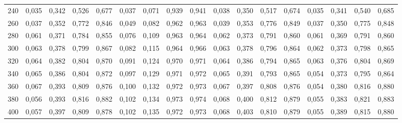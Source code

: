 \begin{table}[htb]
{\begin{tabular}{@{}rrrrrrrrrrrrrrrrr@{}}
240 & 0,035 & 0,342 & 0,526 & 0,677 & 0,037 & 0,071 & 0,939 & 0,941 & 0,038 & 0,350 & 0,517 & 0,674 & 0,035 & 0,341 & 0,540 & 0,685 \\
260 & 0,037 & 0,352 & 0,772 & 0,846 & 0,049 & 0,082 & 0,962 & 0,963 & 0,039 & 0,353 & 0,776 & 0,849 & 0,037 & 0,350 & 0,775 & 0,848 \\
280 & 0,061 & 0,371 & 0,784 & 0,855 & 0,076 & 0,109 & 0,963 & 0,964 & 0,062 & 0,373 & 0,791 & 0,860 & 0,061 & 0,369 & 0,791 & 0,860 \\
300 & 0,063 & 0,378 & 0,799 & 0,867 & 0,082 & 0,115 & 0,964 & 0,966 & 0,063 & 0,378 & 0,796 & 0,864 & 0,062 & 0,373 & 0,798 & 0,865 \\
320 & 0,064 & 0,382 & 0,804 & 0,870 & 0,091 & 0,124 & 0,970 & 0,971 & 0,064 & 0,386 & 0,794 & 0,865 & 0,063 & 0,376 & 0,804 & 0,869 \\
340 & 0,065 & 0,386 & 0,804 & 0,872 & 0,097 & 0,129 & 0,971 & 0,972 & 0,065 & 0,391 & 0,793 & 0,865 & 0,054 & 0,373 & 0,795 & 0,864 \\
360 & 0,067 & 0,393 & 0,809 & 0,876 & 0,100 & 0,132 & 0,972 & 0,973 & 0,067 & 0,397 & 0,808 & 0,876 & 0,054 & 0,380 & 0,816 & 0,880 \\
380 & 0,056 & 0,393 & 0,816 & 0,882 & 0,102 & 0,134 & 0,973 & 0,974 & 0,068 & 0,400 & 0,812 & 0,879 & 0,055 & 0,383 & 0,821 & 0,883 \\
400 & 0,057 & 0,397 & 0,809 & 0,878 & 0,102 & 0,135 & 0,972 & 0,973 & 0,068 & 0,403 & 0,810 & 0,879 & 0,055 & 0,389 & 0,815 & 0,880 \\ \bottomrule
\end{tabular}%
}
\end{table}

